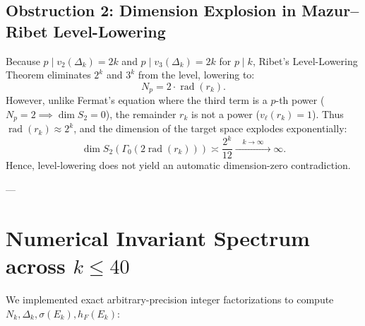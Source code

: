 \documentclass[11pt,reqno]{amsart}
\theoremstyle{definition}
\numberwithin{equation}{section}
\begin{document}
\subsection{Obstruction 2: Dimension Explosion in Mazur--Ribet Level-Lowering}
Because $p \mid v_2(\Delta_k) = 2k$ and $p \mid v_3(\Delta_k) = 2k$ for $p \mid k$, Ribet's Level-Lowering Theorem \cite{ribet1990} eliminates $2^k$ and $3^k$ from the level, lowering to:
\begin{equation}
N_p = 2 \cdot \operatorname{rad}(r_k).
\end{equation}
However, unlike Fermat's equation where the third term is a $p$-th power ($N_p = 2 \implies \dim S_2 = 0$), the remainder $r_k$ is not a power ($v_\ell(r_k) = 1$). Thus $\operatorname{rad}(r_k) \approx 2^k$, and the dimension of the target space explodes exponentially:
\begin{equation}
\dim S_2(\Gamma_0(2 \operatorname{rad}(r_k))) \asymp \frac{2^k}{12} \xrightarrow{\quad k \to \infty \quad} \infty.
\end{equation}
Hence, level-lowering does not yield an automatic dimension-zero contradiction.

---

\section{Numerical Invariant Spectrum across $k \le 40$}

We implemented exact arbitrary-precision integer factorizations to compute $N_k, \Delta_k, \sigma(E_k), h_F(E_k)$:
\end{document}

